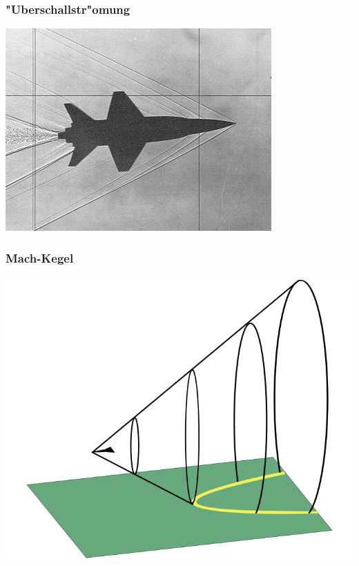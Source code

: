 \documentclass[handout]{beamer}
\begin{document}
\begin{frame}
\frametitle{"Uberschallstr"omung}
\begin{center}
\includegraphics[width=\hsize]{../../skript/graphics/i-5-1.jpg}
\end{center}
\end{frame}

\begin{frame}
\frametitle{Mach-Kegel}
\begin{center}
\includegraphics[width=0.8\hsize]{../../skript/graphics/shock.png}
\end{center}
\end{frame}
\end{document}
